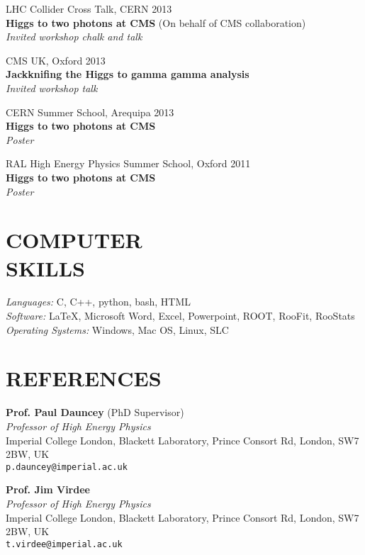 \documentclass[margin, 10pt]{res} %
\begin{document}
\begin{resume}
LHC Collider Cross Talk, CERN 2013 \\
\textbf{Higgs to two photons at CMS} (On behalf of CMS collaboration) \\
\textit{Invited workshop chalk and talk}

CMS UK, Oxford 2013 \\
\textbf{Jackknifing the Higgs to gamma gamma analysis} \\
\textit{Invited workshop talk}

CERN Summer School, Arequipa 2013 \\
\textbf{Higgs to two photons at CMS} \\
\textit{Poster}

RAL High Energy Physics Summer School, Oxford 2011 \\
\textbf{Higgs to two photons at CMS} \\
\textit{Poster}


\section{COMPUTER \\ SKILLS}

{\sl Languages:}
C, C++, python, bash, HTML \\
{\sl Software:}
\LaTeX, Microsoft Word, Excel, Powerpoint, ROOT, RooFit, RooStats \\
{\sl Operating Systems:}
Windows, Mac OS, Linux, SLC


\section{REFERENCES}
\textbf{Prof. Paul Dauncey} (PhD Supervisor) \\
\textit{Professor of High Energy Physics} \\
Imperial College London, Blackett Laboratory, Prince Consort Rd, London, SW7 2BW, UK \\
\texttt{p.dauncey@imperial.ac.uk}

\textbf{Prof. Jim Virdee} \\
\textit{Professor of High Energy Physics} \\
Imperial College London, Blackett Laboratory, Prince Consort Rd, London, SW7 2BW, UK \\
\texttt{t.virdee@imperial.ac.uk}


\end{resume}
\end{document}
